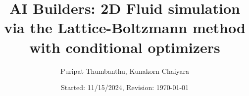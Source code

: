 \documentclass[b5paper, 11pt, openleft]{memoir}
\begin{document}
\frontmatter
\title{
	\vspace{-5em}
	\textbf{
		AI Builders: 2D Fluid simulation via the Lattice-Boltzmann method with conditional optimizers
	}
}
\author{Puripat Thumbanthu, Kunakorn Chaiyara}
\date{Started: 11/15/2024, Revision: \today}
\maketitle

\tableofcontents*

\mainmatter






\printbibliography
\end{document}
